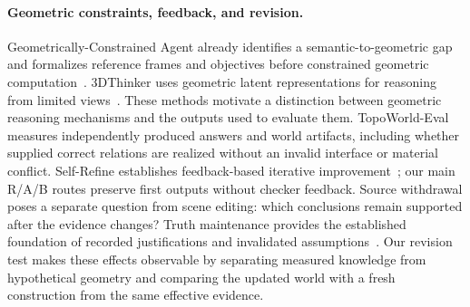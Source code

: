 \paragraph{Geometric constraints, feedback, and revision.}
Geometrically-Constrained Agent already identifies a semantic-to-geometric gap and formalizes reference frames and objectives before constrained geometric computation~\cite{gca2026}.
3DThinker uses geometric latent representations for reasoning from limited views~\cite{think3d2026}.
These methods motivate a distinction between geometric reasoning mechanisms and the outputs used to evaluate them.
TopoWorld-Eval measures independently produced answers and world artifacts, including whether supplied correct relations are realized without an invalid interface or material conflict.
Self-Refine establishes feedback-based iterative improvement~\cite{selfrefine2023}; our main R/A/B routes preserve first outputs without checker feedback.
Source withdrawal poses a separate question from scene editing: which conclusions remain supported after the evidence changes?
Truth maintenance provides the established foundation of recorded justifications and invalidated assumptions~\cite{doyle1979}.
Our revision test makes these effects observable by separating measured knowledge from hypothetical geometry and comparing the updated world with a fresh construction from the same effective evidence.
